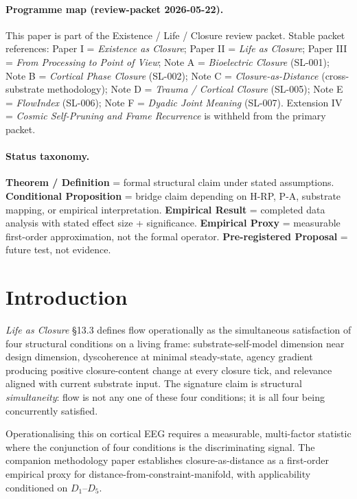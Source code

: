 \documentclass[11pt,a4paper]{article}
\begin{document}
\paragraph{Programme map (review-packet 2026-05-22).}
This paper is part of the Existence / Life / Closure review packet. Stable packet references:
Paper I = \emph{Existence as Closure};
Paper II = \emph{Life as Closure};
Paper III = \emph{From Processing to Point of View};
Note A = \emph{Bioelectric Closure} (SL-001);
Note B = \emph{Cortical Phase Closure} (SL-002);
Note C = \emph{Closure-as-Distance} (cross-substrate methodology);
Note D = \emph{Trauma / Cortical Closure} (SL-005);
Note E = \emph{FlowIndex} (SL-006);
Note F = \emph{Dyadic Joint Meaning} (SL-007).
Extension IV = \emph{Cosmic Self-Pruning and Frame Recurrence} is withheld from the primary packet.

\paragraph{Status taxonomy.}
\textbf{Theorem / Definition} = formal structural claim under stated assumptions.
\textbf{Conditional Proposition} = bridge claim depending on H-RP, P-A, substrate mapping, or empirical interpretation.
\textbf{Empirical Result} = completed data analysis with stated effect size + significance.
\textbf{Empirical Proxy} = measurable first-order approximation, not the formal operator.
\textbf{Pre-registered Proposal} = future test, not evidence.



\section{Introduction}\label{sec:intro}

\emph{Life as Closure} \S 13.3 \citep{SmartLifeAsClosure} defines flow operationally as the simultaneous satisfaction of four structural conditions on a living frame: substrate-self-model dimension near design dimension, dyscoherence at minimal steady-state, agency gradient producing positive closure-content change at every closure tick, and relevance aligned with current substrate input. The signature claim is structural \emph{simultaneity}: flow is not any one of these four conditions; it is all four being concurrently satisfied.

Operationalising this on cortical EEG requires a measurable, multi-factor statistic where the conjunction of four conditions is the discriminating signal. The companion methodology paper \citep{SmartClosureDistance} establishes closure-as-distance as a first-order empirical proxy for distance-from-constraint-manifold, with applicability conditioned on $D_1$--$D_5$.
\end{document}
